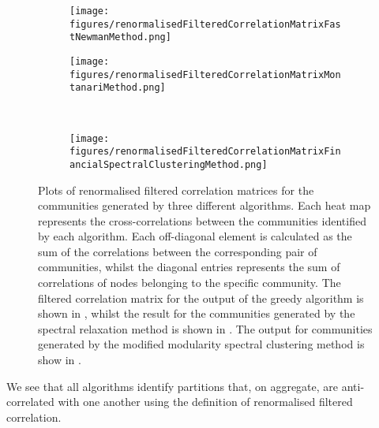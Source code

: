 \begin{figure}
\centering
	\begin{subfigure}{.5\textwidth}
		\centering
		\texttt{[image: figures/renormalisedFilteredCorrelationMatrixFastNewmanMethod.png]}
		\caption{}
		\label{fig:renormalisedFilteredCorrelationMatrixGreedyAlgorithm}
	\end{subfigure}%
	\begin{subfigure}{.5\textwidth}
		\centering
		\texttt{[image: figures/renormalisedFilteredCorrelationMatrixMontanariMethod.png]}
		\caption{}
		\label{fig:renormalisedFilteredCorrelationMatrixSpectralRelaxation}
	\end{subfigure}\\
	\begin{subfigure}{.5\textwidth}
		\centering
		\texttt{[image: figures/renormalisedFilteredCorrelationMatrixFinancialSpectralClusteringMethod.png]}
		\caption{}
		\label{fig:renormalisedFilteredCorrelationMatrixSpectralClustering}
	\end{subfigure}
	\caption[Plots of renormalised filtered correlation matrices for the communities generated by three different algorithms.]{\label{fig:renormalisedFilteredCorrelationMatrices} Plots of renormalised filtered correlation matrices for the communities generated by three different algorithms. Each heat map represents the cross-correlations between the communities identified by each algorithm. Each off-diagonal element is calculated as the sum of the correlations between the corresponding pair of communities, whilst the diagonal entries represents the sum of correlations of nodes belonging to the specific community. The filtered correlation matrix for the output of the greedy algorithm is shown in , whilst the result for the communities generated by the spectral relaxation method is shown in . The output for communities generated by the modified modularity spectral clustering method is show in .}
\end{figure}

We see that all algorithms identify partitions that, on aggregate, are anti-correlated with one another using the definition of renormalised filtered correlation.

